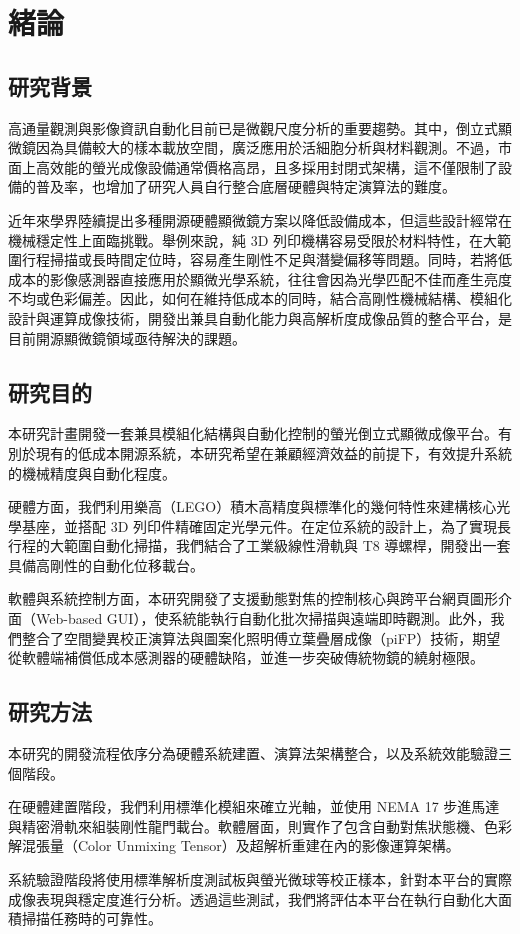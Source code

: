
\chapter{緒論}

\section{研究背景}

高通量觀測與影像資訊自動化目前已是微觀尺度分析的重要趨勢。其中，倒立式顯微鏡因為具備較大的樣本載放空間，廣泛應用於活細胞分析與材料觀測。不過，市面上高效能的螢光成像設備通常價格高昂，且多採用封閉式架構，這不僅限制了設備的普及率，也增加了研究人員自行整合底層硬體與特定演算法的難度。

近年來學界陸續提出多種開源硬體顯微鏡方案以降低設備成本，但這些設計經常在機械穩定性上面臨挑戰。舉例來說，純 3D 列印機構容易受限於材料特性，在大範圍行程掃描或長時間定位時，容易產生剛性不足與潛變偏移等問題。同時，若將低成本的影像感測器直接應用於顯微光學系統，往往會因為光學匹配不佳而產生亮度不均或色彩偏差。因此，如何在維持低成本的同時，結合高剛性機械結構、模組化設計與運算成像技術，開發出兼具自動化能力與高解析度成像品質的整合平台，是目前開源顯微鏡領域亟待解決的課題。

\section{研究目的}

本研究計畫開發一套兼具模組化結構與自動化控制的螢光倒立式顯微成像平台。有別於現有的低成本開源系統，本研究希望在兼顧經濟效益的前提下，有效提升系統的機械精度與自動化程度。

硬體方面，我們利用樂高（LEGO）積木高精度與標準化的幾何特性來建構核心光學基座，並搭配 3D 列印件精確固定光學元件。在定位系統的設計上，為了實現長行程的大範圍自動化掃描，我們結合了工業級線性滑軌與 T8 導螺桿，開發出一套具備高剛性的自動化位移載台。

軟體與系統控制方面，本研究開發了支援動態對焦的控制核心與跨平台網頁圖形介面（Web-based GUI），使系統能執行自動化批次掃描與遠端即時觀測。此外，我們整合了空間變異校正演算法與圖案化照明傅立葉疊層成像（piFP）技術，期望從軟體端補償低成本感測器的硬體缺陷，並進一步突破傳統物鏡的繞射極限。

\section{研究方法}

本研究的開發流程依序分為硬體系統建置、演算法架構整合，以及系統效能驗證三個階段。

在硬體建置階段，我們利用標準化模組來確立光軸，並使用 NEMA 17 步進馬達與精密滑軌來組裝剛性龍門載台。軟體層面，則實作了包含自動對焦狀態機、色彩解混張量（Color Unmixing Tensor）及超解析重建在內的影像運算架構。

系統驗證階段將使用標準解析度測試板與螢光微球等校正樣本，針對本平台的實際成像表現與穩定度進行分析。透過這些測試，我們將評估本平台在執行自動化大面積掃描任務時的可靠性。
